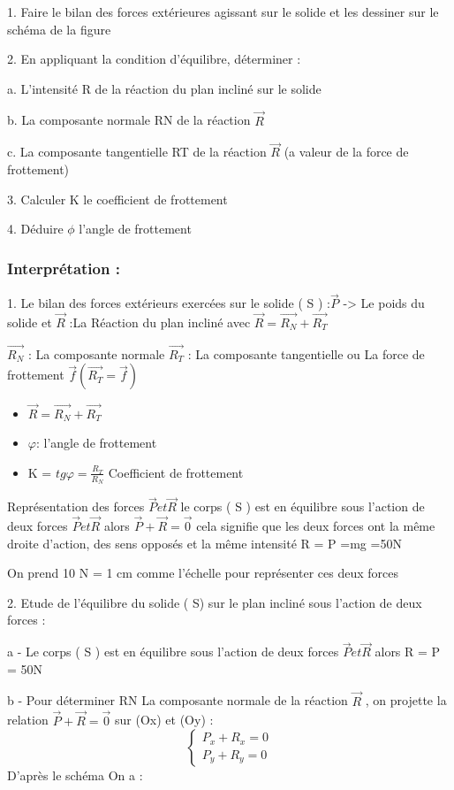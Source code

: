 \documentclass[12pt]{article}
\begin{document}
1. Faire le bilan des forces extérieures agissant sur le solide et les
dessiner sur le schéma de la figure

2. En appliquant la condition d’équilibre, déterminer :
  
  a. L’intensité R de la réaction du plan incliné sur le solide
 
  b. La composante normale RN de la réaction $\vec{R}$

  c. La composante tangentielle RT de la réaction $\vec{R}$ (a valeur de la
force de frottement)

3. Calculer K le coefficient de frottement

4. Déduire $\phi$ l’angle de frottement


\subsubsection{Interprétation :}

1. Le bilan des forces extérieurs exercées sur le solide ( S ) :$ \vec{P}$ -> Le poids du solide et $\vec{R}$ :La Réaction du plan incliné avec   $\vec{R} = \vec{R_N} + \vec{R_T}$

$\vec{R_N}$ : La composante normale
$\vec{R_T} $ : La composante tangentielle ou La force de
frottement  $\vec{f} (\vec{R_T} =\vec{f}) $

\begin{itemize}
    \item  $\vec{R} = \vec{R_N} + \vec{R_T}$
    \item  $\varphi$: l’angle de frottement
    \item K = $tg\varphi = \frac{R_T}{R_N}$ Coefficient de frottement 
\end{itemize}
Représentation des forces $\vec{{P}} et\vec{R}$ 
le corps ( S ) est en équilibre sous l’action de deux forces $\vec{{P}} et\vec{R}$ alors $\vec{P} + \vec{R} = \vec{0}$
cela signifie
que les deux forces ont la même droite d’action, des sens opposés et la même intensité
R = P =mg =50N

On prend 10 N =  1 cm comme l’échelle pour représenter ces deux forces 

2. Etude de l’équilibre du solide ( S) sur le plan incliné sous l’action de deux forces :
 
 a - Le corps ( S ) est en équilibre sous l’action de deux forces $\vec{{P}} et\vec{R}$ alors R = P = 50N

 b - Pour déterminer RN La composante normale de la réaction $\vec{R}$ , on projette la relation $\vec{P} + \vec{R} = \vec{0}$ sur (Ox) et (Oy) : 
$$\begin{cases}
  P_x + R_x = 0\\
  P_y + R_y = 0
\end{cases}
$$
D’après le schéma On a : 
\end{document}
